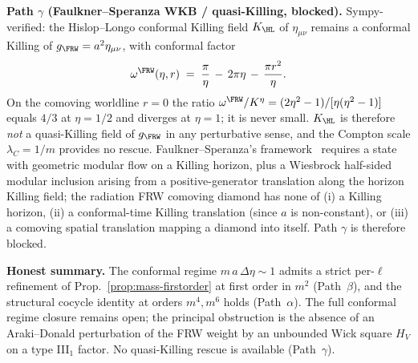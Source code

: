 \begin{remark}
\noindent\textbf{Path $\gamma$ (Faulkner--Speranza WKB / quasi-Killing,
blocked).}
Sympy-verified: the Hislop--Longo conformal Killing field $K_\HL$ of
$\eta_{\mu\nu}$ remains a conformal Killing of $g_\FRW=a^2\eta_{\mu\nu}$,
with conformal factor
\[
\omega^\FRW(\eta,r)\;=\;\frac{\pi}{\eta}\,-\,2\pi\eta\,-\,\frac{\pi r^2}{\eta}.
\]
On the comoving worldline $r=0$ the ratio
$\omega^\FRW/K^\eta=(2\eta^2-1)/[\eta(\eta^2-1)]$
equals $4/3$ at $\eta=1/2$ and diverges at $\eta=1$; it is never small.
$K_\HL$ is therefore \emph{not} a quasi-Killing field of $g_\FRW$ in
any perturbative sense, and the Compton scale $\lambda_C=1/m$ provides
no rescue.  Faulkner--Speranza's framework~\cite{FaulknerSperanza2024}
requires a state with geometric modular flow on a Killing horizon, plus
a Wiesbrock half-sided modular inclusion arising from a
positive-generator translation along the horizon Killing field; the
radiation FRW comoving diamond has none of (i) a Killing horizon, (ii)
a conformal-time Killing translation (since $a$ is non-constant), or
(iii) a comoving spatial translation mapping a diamond into itself.
Path $\gamma$ is therefore blocked.

\noindent\textbf{Honest summary.} The conformal regime
$m\,a\,\Delta\eta\sim 1$ admits a strict per-$\ell$ refinement of
Prop.~\ref{prop:mass-firstorder} at first order in $m^2$
(Path~$\beta$), and the structural cocycle identity at orders $m^4,m^6$
holds (Path~$\alpha$).  The full conformal regime closure remains open;
the principal obstruction is the absence of an Araki--Donald
perturbation of the FRW weight by an unbounded Wick square $H_V$ on a
type III$_1$ factor.  No quasi-Killing rescue is available
(Path~$\gamma$).
\end{remark}

%
%
%
